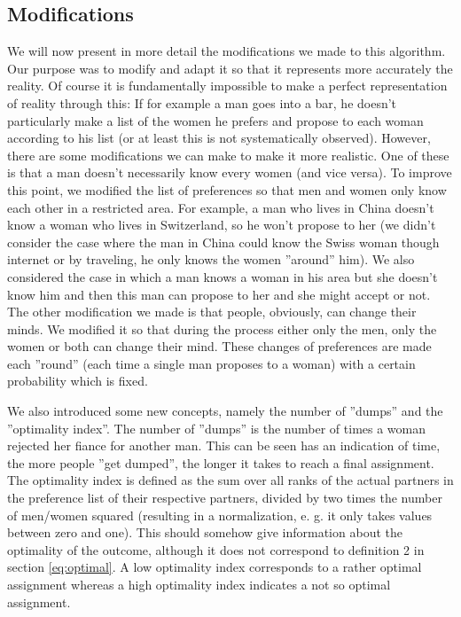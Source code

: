 \documentclass[11pt]{article}
\begin{document}
\subsection{Modifications} \label{mods}

We will now present in more detail the modifications we made to this algorithm. Our purpose was 
to modify and adapt it so that it represents more accurately the reality. Of course it is fundamentally 
impossible to make a perfect representation of reality through this: If for example a man 
goes into a bar, he doesn't particularly make a list of the women he prefers and propose to each 
woman according to his list (or at least this is not systematically observed). 
However, there are some modifications we can make to make it more realistic. One of these is that 
a man doesn't necessarily know every women (and vice versa). To improve this point, we modified 
the list of preferences so that men and women only know each other in a restricted area. For 
example, a man who lives in China doesn't know a woman who lives in Switzerland, so he won't 
propose to her (we didn't consider the case where the man in China could know the Swiss 
woman though internet or by traveling, he only knows the women ''around'' him). We also considered 
the case in which a man knows a woman in his area but she doesn't know him and then this man can 
propose to her and she might accept or not. 
The other modification we made is that people, obviously, can change their minds. We modified it so 
that during the process either only the men, only the women or both can change their mind. These 
changes of preferences are made each ''round'' (each time a single man proposes to a woman) with a 
certain probability which is fixed.

We also introduced some new concepts, namely the number of ''dumps'' and the ''optimality index''. The 
number of ''dumps'' is the number of times a woman rejected her fiance for another man. This can 
be seen has an indication of time, the more people ''get dumped'', the longer it takes to reach a final 
assignment. 
The optimality index is defined as the sum over all ranks of the actual partners
in the preference list of their respective partners, divided by two times the number of men/women squared (resulting in a normalization, e. g. 
it only takes values between zero and one). This should somehow give information about the optimality of the outcome, although it does
not correspond to definition 2 in section \ref{eq:optimal}. A low optimality index corresponds to a rather optimal assignment whereas a high
optimality index indicates a not so optimal assignment.
\end{document}
